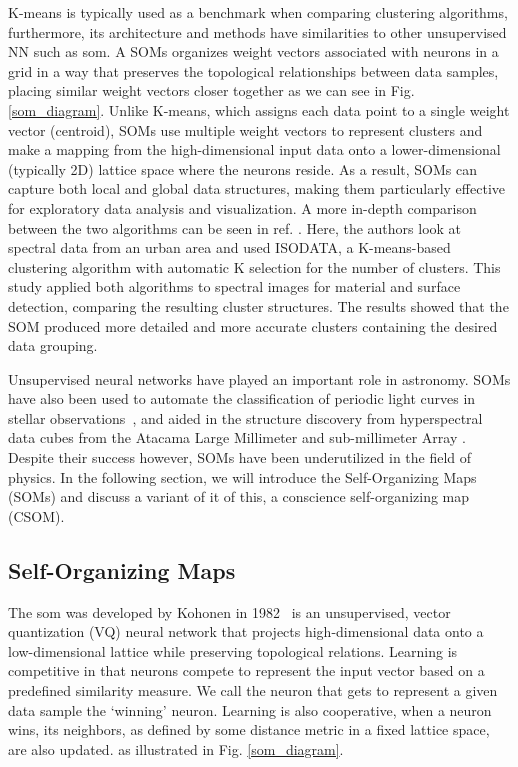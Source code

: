K-means is typically used as a benchmark when comparing clustering algorithms, furthermore, its architecture and methods have similarities to other unsupervised NN such as \acrfull{som}. A SOMs organizes weight vectors associated with neurons in a grid in a way that preserves the topological relationships between data samples, placing similar weight vectors closer together as we can see in Fig.\,\ref{som_diagram}. Unlike K-means, which assigns each data point to a single weight vector (centroid), SOMs use multiple weight vectors to represent clusters and make a mapping from the high-dimensional input data onto a lower-dimensional (typically 2D) lattice space where the neurons reside. As a result, SOMs can capture both local and global data structures, making them particularly effective for exploratory data analysis and visualization. A more in-depth comparison between the two algorithms can be seen in ref. \cite{ISODATA_CSOM_comp_urban}. Here, the authors look at spectral data from an urban area and used ISODATA, a K-means-based clustering algorithm with automatic K selection for the number of clusters. This study applied both algorithms to spectral images for material and surface detection, comparing the resulting cluster structures. The results showed that the SOM produced more detailed and more accurate clusters containing the desired data grouping.

Unsupervised neural networks have played an important role in astronomy. 
SOMs have also been used to automate the classification of periodic light curves in stellar observations~\cite{Brett:2004tc}, and aided in the structure discovery from hyperspectral data cubes from the Atacama Large Millimeter and sub-millimeter Array \cite{7849952}. Despite their success however, SOMs have been underutilized in the field of physics. In the following section, we will introduce the Self-Organizing Maps (SOMs) and discuss a variant of it of this, a conscience self-organizing map (CSOM).

\subsection{Self-Organizing Maps}

The \acrfull{som} was developed by Kohonen in 1982~\cite{Kohonen88} is an unsupervised, vector quantization (VQ) neural network that projects high-dimensional data onto a low-dimensional lattice while preserving topological relations. Learning is competitive in that neurons compete to represent the input vector based on a predefined similarity measure. We call the neuron that gets to represent a given data sample the `winning' neuron. Learning is also cooperative, when a neuron wins, its neighbors, as defined by some distance metric in a fixed lattice space, are also updated. as illustrated in Fig. \ref{som_diagram}.


